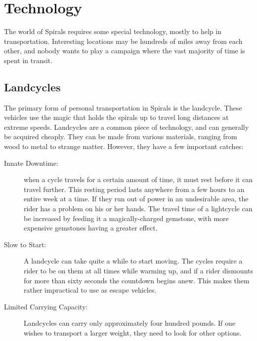 \chapter{Technology}
The world of Spirals requires some special technology, mostly to help in transportation.
Interesting locations may be hundreds of miles away from each other, and nobody wants to play a campaign where the vast majority of time is spent in transit.


\begin{multicols}{2}
\section{Landcycles}
The primary form of personal transportation in Spirals is the landcycle.
These vehicles use the magic that holds the spirals up to travel long distances at extreme speeds.
Landcycles are a common piece of technology, and can generally be acquired cheaply.
They can be made from various materials, ranging from wood to metal to strange matter.
However, they have a few important catches:
\begin{description}
\item[Innate Downtime:] when a cycle travels for a certain amount of time, it must rest before it can travel further. 
This resting period lasts anywhere from a few hours to an entire week at a time.
If they run out of power in an undesirable area, the rider has a problem on his or her hands.
The travel time of a lightcycle can be increased by feeding it a magically-charged gemstone, with more expensive gemstones having a greater effect.
\item[Slow to Start:] A landcycle can take quite a while to start moving.
The cycles require a rider to be on them at all times while warming up, and if a rider dismounts for more than sixty seconds the countdown begins anew.
This makes them rather impractical to use as escape vehicles.
\item[Limited Carrying Capacity:] Landcycles can carry only approximately four hundred pounds.
If one wishes to transport a larger weight, they need to look for other options.
\end{description}
\end{multicols}
